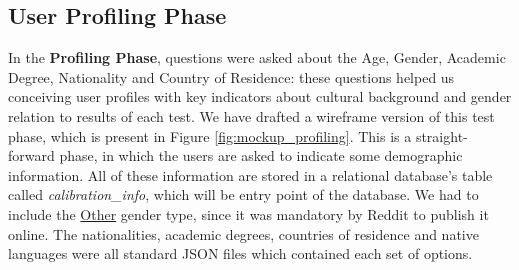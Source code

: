 \subsection{User Profiling Phase}
\label{subsec:design_profiling}
%
In the \textbf{Profiling Phase}, questions were asked about the Age, Gender, Academic Degree, Nationality and Country of Residence: these
questions helped us conceiving user profiles with key indicators about cultural background and gender relation to results of each test.
%
We have drafted a wireframe version of this test phase, which is present in Figure \ref{fig:mockup_profiling}. This is a straight-forward
phase, in which the users are asked to indicate some demographic information. All of these information are stored in a relational database's
table called \emph{calibration\_info}, which will be entry point of the database. We had to include the \ul{Other} gender type, since it was
mandatory by Reddit to publish it online. The nationalities, academic degrees, countries of residence and native languages were all standard
JSON files which contained each set of options. \par
%
